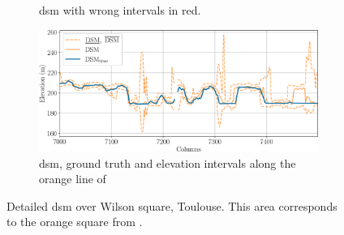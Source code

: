 \begin{figure}
\begin{subfigure}[t]{0.49\linewidth}
        \caption{\acrshort{dsm} with wrong intervals in red.}
        \label{fig:toulouse_error_zoom}
    \end{subfigure}
    \begin{subfigure}[t]{\linewidth}
        \centering
        \includegraphics[width=\linewidth]{Images/Chap_6/Toulouse_row_4720.png}
        \caption{\acrshort{dsm}, ground truth and elevation intervals along the orange line of }
        \label{fig:toulouse_zoom_row}
    \end{subfigure}
    \caption{Detailed \acrshort{dsm} over Wilson square, Toulouse. This area corresponds to the orange square from .}
    \label{fig:toulouse_zoom}
\end{figure}


